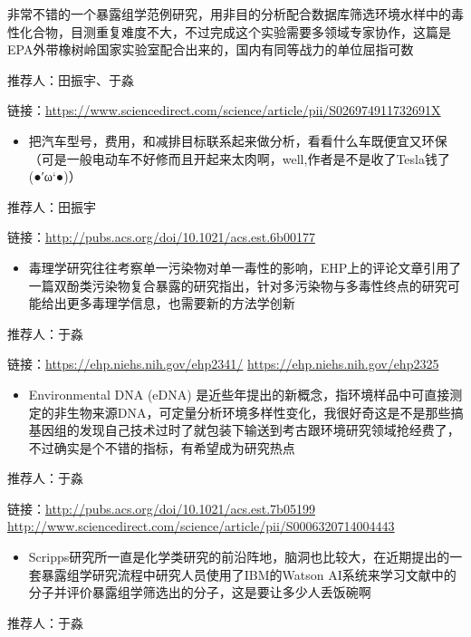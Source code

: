 \documentclass[
]{book}
\providecommand{\tightlist}{%
  \setlength{\itemsep}{0pt}\setlength{\parskip}{0pt}}
\begin{document}
非常不错的一个暴露组学范例研究，用非目的分析配合数据库筛选环境水样中的毒性化合物，目测重复难度不大，不过完成这个实验需要多领域专家协作，这篇是EPA外带橡树岭国家实验室配合出来的，国内有同等战力的单位屈指可数

推荐人：田振宇、于淼

链接：\url{https://www.sciencedirect.com/science/article/pii/S026974911732691X}

\begin{itemize}
\tightlist
\item
  把汽车型号，费用，和减排目标联系起来做分析，看看什么车既便宜又环保（可是一般电动车不好修而且开起来太肉啊，well,作者是不是收了Tesla钱了 (●′ω`●)）
\end{itemize}

推荐人：田振宇

链接：\url{http://pubs.acs.org/doi/10.1021/acs.est.6b00177}

\begin{itemize}
\tightlist
\item
  毒理学研究往往考察单一污染物对单一毒性的影响，EHP上的评论文章引用了一篇双酚类污染物复合暴露的研究指出，针对多污染物与多毒性终点的研究可能给出更多毒理学信息，也需要新的方法学创新
\end{itemize}

推荐人：于淼

链接：\url{https://ehp.niehs.nih.gov/ehp2341/} \url{https://ehp.niehs.nih.gov/ehp2325}

\begin{itemize}
\tightlist
\item
  Environmental DNA (eDNA) 是近些年提出的新概念，指环境样品中可直接测定的非生物来源DNA，可定量分析环境多样性变化，我很好奇这是不是那些搞基因组的发现自己技术过时了就包装下输送到考古跟环境研究领域抢经费了，不过确实是个不错的指标，有希望成为研究热点
\end{itemize}

推荐人：于淼

链接：\url{http://pubs.acs.org/doi/10.1021/acs.est.7b05199} \url{http://www.sciencedirect.com/science/article/pii/S0006320714004443}

\begin{itemize}
\tightlist
\item
  Scripps研究所一直是化学类研究的前沿阵地，脑洞也比较大，在近期提出的一套暴露组学研究流程中研究人员使用了IBM的Watson AI系统来学习文献中的分子并评价暴露组学筛选出的分子，这是要让多少人丢饭碗啊
\end{itemize}

推荐人：于淼
\end{document}
